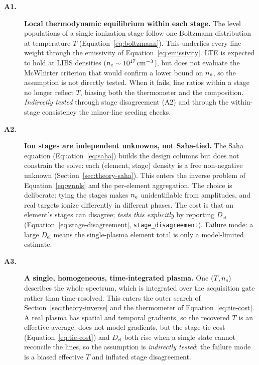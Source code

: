 \begin{description}

\item[\textbf{A1.}] \textbf{Local thermodynamic equilibrium within each stage.}
The level populations of a single ionization stage follow one Boltzmann distribution
at temperature $T$ (Equation~\eqref{eq:boltzmann}). This underlies every line weight
through the emissivity of Equation~\eqref{eq:emissivity}. LTE is expected to hold at
LIBS densities ($n_{\mathrm{e}}\sim\SI{e17}{\per\cubic\centi\meter}$), but \alibz{} does not
evaluate the McWhirter criterion that would confirm a lower bound on $n_{\mathrm{e}}$, so the
assumption is not directly tested. When it fails, line ratios within a stage no longer
reflect $T$, biasing both the thermometer and the composition. \emph{Indirectly
tested} through stage disagreement (A2) and through the within-stage consistency the
minor-line seeding checks.

\item[\textbf{A2.}] \textbf{Ion stages are independent unknowns, not Saha-tied.}
The Saha equation (Equation~\eqref{eq:saha}) builds the design columns but does not
constrain the solve: each (element, stage) density is a free non-negative unknown
(Section~\ref{sec:theory-saha}). This enters the inverse problem of
Equation~\eqref{eq:wnnls} and the per-element aggregation. The choice is deliberate:
tying the stages makes $n_{\mathrm{e}}$ unidentifiable from amplitudes, and real targets ionize
differently in different phases. The cost is that an element's stages can disagree;
\alibz{} \emph{tests this explicitly} by reporting
$D_\mathrm{el}$ (Equation~\eqref{eq:stage-disagreement}, \texttt{stage\_disagreement}).
Failure mode: a large $D_\mathrm{el}$ means the single-plasma element total is only a
model-limited estimate.

\item[\textbf{A3.}] \textbf{A single, homogeneous, time-integrated plasma.}
One $(T,n_{\mathrm{e}})$ describes the whole spectrum, which is integrated over the acquisition
gate rather than time-resolved. This enters the outer search of
Section~\ref{sec:theory-inverse} and the thermometer of Equation~\eqref{eq:tie-cost}.
A real plasma has spatial and temporal gradients, so the recovered $T$ is an
effective average. \alibz{} does not model gradients, but the stage-tie cost
(Equation~\eqref{eq:tie-cost}) and $D_\mathrm{el}$ both rise when a single state
cannot reconcile the lines, so the assumption is \emph{indirectly tested}; the failure
mode is a biased effective $T$ and inflated stage disagreement.


\end{description}
